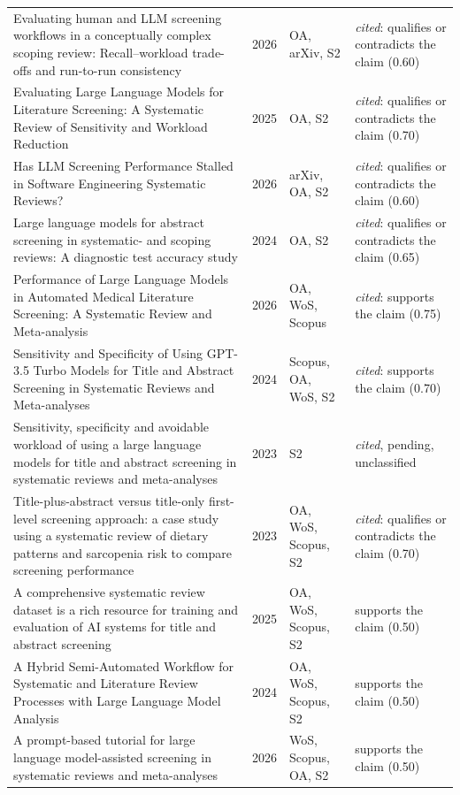 \begin{longtable}{@{}%
  >{\raggedright\arraybackslash}p{}c%
  >{\raggedright\arraybackslash}p{}%
  >{\raggedright\arraybackslash}p{}@{}}
Evaluating human and LLM screening workflows in a conceptually complex scoping review: Recall--workload trade-offs and run-to-run consistency & 2026 & OA, arXiv, S2 & \emph{cited}: qualifies or contradicts the claim (0.60) \\
Evaluating Large Language Models for Literature Screening: A Systematic Review of Sensitivity and Workload Reduction & 2025 & OA, S2 & \emph{cited}: qualifies or contradicts the claim (0.70) \\
Has LLM Screening Performance Stalled in Software Engineering Systematic Reviews? & 2026 & arXiv, OA, S2 & \emph{cited}: qualifies or contradicts the claim (0.60) \\
Large language models for abstract screening in systematic- and scoping reviews: A diagnostic test accuracy study & 2024 & OA, S2 & \emph{cited}: qualifies or contradicts the claim (0.65) \\
Performance of Large Language Models in Automated Medical Literature Screening: A Systematic Review and Meta-analysis & 2026 & OA, WoS, Scopus & \emph{cited}: supports the claim (0.75) \\
Sensitivity and Specificity of Using GPT-3.5 Turbo Models for Title and Abstract Screening in Systematic Reviews and Meta-analyses & 2024 & Scopus, OA, WoS, S2 & \emph{cited}: supports the claim (0.70) \\
Sensitivity, specificity and avoidable workload of using a large language models for title and abstract screening in systematic reviews and meta-analyses & 2023 & S2 & \emph{cited}, pending, unclassified \\
Title-plus-abstract versus title-only first-level screening approach: a case study using a systematic review of dietary patterns and sarcopenia risk to compare screening performance & 2023 & OA, WoS, Scopus, S2 & \emph{cited}: qualifies or contradicts the claim (0.70) \\
A comprehensive systematic review dataset is a rich resource for training and evaluation of AI systems for title and abstract screening & 2025 & OA, WoS, Scopus, S2 & supports the claim (0.50) \\
A Hybrid Semi-Automated Workflow for Systematic and Literature Review Processes with Large Language Model Analysis & 2024 & OA, WoS, Scopus, S2 & supports the claim (0.50) \\
A prompt-based tutorial for large language model-assisted screening in systematic reviews and meta-analyses & 2026 & WoS, Scopus, OA, S2 & supports the claim (0.50) \\

\end{longtable}
